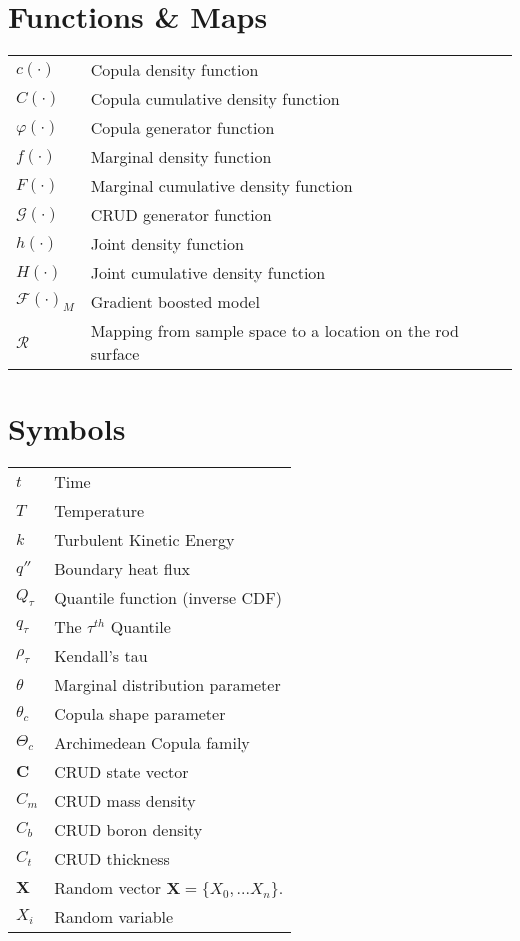 \pagebreak

\nomenclature

\section*{Functions \& Maps}
\begin{tabular}{l l}
$c(\cdot)$ & Copula density function \\
$C(\cdot)$ & Copula cumulative density function \\
$\varphi(\cdot)$ & Copula generator function \\
$f(\cdot)$ & Marginal density function \\
$F(\cdot)$ & Marginal cumulative density function \\
$\mathcal G(\cdot)$ & CRUD generator function \\
$h(\cdot)$ & Joint density function \\
$H(\cdot)$ & Joint cumulative density function \\
$\mathcal F(\cdot)_M$ & Gradient boosted model \\
$\mathcal R$ & Mapping from sample space to a location on the rod surface \\
\end{tabular}

\section*{Symbols}
\begin{tabular}{l l}
$t$ & Time \\
$T$ & Temperature \\
$k$ & Turbulent Kinetic Energy \\
$q''$ & Boundary heat flux \\
$Q_{\tau}$ & Quantile function (inverse CDF) \\
$q_{\tau}$ & The $\tau^{th}$ Quantile \\
$\rho_{\tau}$ & Kendall's tau \\
$\theta$ & Marginal distribution parameter \\
$\theta_c$ & Copula shape parameter \\
$\Theta_c$ & Archimedean Copula family \\
$\mathbf C$ & CRUD state vector \\
$C_m$ & CRUD mass density \\
$C_b$ & CRUD boron density \\
$C_t$ & CRUD thickness \\
$\mathbf X$ & Random vector $\mathbf X = \{X_0, ... X_n\}$. \\
$X_i$ & Random variable \\
\end{tabular}


\listoftables

\listoffigures

\pagebreak
